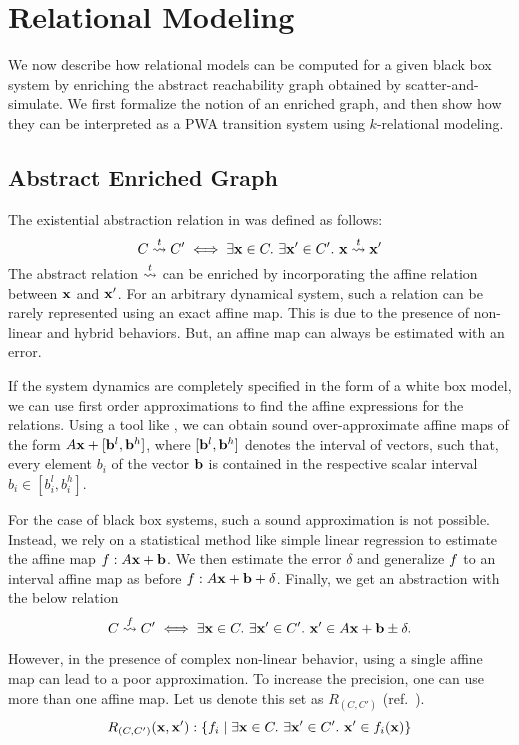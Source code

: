 \section{Relational Modeling}

We now describe how relational models can be computed for a given
black box system by enriching the abstract reachability graph obtained
by scatter-and-simulate. We first formalize the notion of an enriched
graph, and then show how they can be interpreted as a PWA transition
system using $k$-relational modeling.

\subsection{Abstract Enriched Graph}

The existential abstraction relation in  was defined as
follows:
\[
    C \overset{t}{\rightsquigarrow} C' \iff \exists \mathbf{x} \in C.\ \exists \mathbf{x}' \in C'.\ \mathbf{x} \overset{t}{\rightsquigarrow} \mathbf{x}'
\]
The abstract relation $\overset{t}{\rightsquigarrow}$ can be enriched by incorporating
the affine relation between $\mathbf{x}$ and $\mathbf{x}'$. For an arbitrary dynamical
system, such a relation can be rarely represented using an exact affine map.
This is due to the presence of non-linear and hybrid behaviors. But,
an affine map can always be estimated with an error.

If the system dynamics are completely specified in the form of a white
box model, we can use first order approximations to find the affine
expressions for the relations. Using a tool like \flowstar, we can
obtain sound over-approximate affine maps of the form $A\mathbf{x} + [\mathbf{b}^l,
\mathbf{b}^h]$, where $[\mathbf{b}^l,\mathbf{b}^h]$ denotes the interval of vectors, such
that, every element $b_i$ of the vector $\mathbf{b}$ is contained in the
respective scalar interval $b_i\in[b^l_i,b^h_i]$.

For the case of black box systems, such a sound approximation is not
possible. Instead, we rely on a statistical method like simple linear
regression to estimate the affine map $f: A\mathbf{x} + \mathbf{b}$. We then
estimate the error $\delta$ and generalize $f$ to an interval
affine map as before $f: A\mathbf{x} + \mathbf{b} + \delta$.  Finally, we get an
abstraction with the below relation
\[
    C \overset{f}{\rightsquigarrow} C' \iff \exists \mathbf{x} \in C.\ \exists \mathbf{x}' \in C'.\ \mathbf{x}' \in A\mathbf{x} + \mathbf{b} \pm \delta.
\]

However, in the presence of complex non-linear behavior, using a
single affine map can lead to a poor approximation. To increase the
precision, one can use more than one affine map. Let us denote this set as
$R_{(C,C')}$ (ref.~).
\[
    R_{(C,C')}(\mathbf{x},\mathbf{x}'): \{f_i \;|\; \exists \mathbf{x} \in C.\ \exists \mathbf{x}' \in C'.\ \mathbf{x}' \in f_i(\mathbf{x})\}
\]

